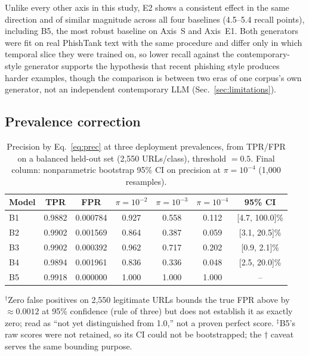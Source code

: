 \documentclass[conference]{IEEEtran}
\begin{document}
Unlike every other axis in this study, E2 shows a consistent effect in
the same direction and of similar magnitude across all four baselines
(4.5--5.4 recall points), including B5, the most robust baseline on
Axis~S and Axis~E1. Both generators were fit on real PhishTank text with
the same procedure and differ only in which temporal slice they were
trained on, so lower recall against the contemporary-style generator
supports the hypothesis that recent phishing style produces harder
examples, though the comparison is between two eras of one corpus's
own generator, not an independent contemporary LLM
(Sec.~\ref{sec:limitations}).

\subsection{Prevalence correction}
\label{sec:prevalence-results}

\begin{table}[t]
\caption{Precision by Eq.~\eqref{eq:prec} at three deployment prevalences,
from TPR/FPR on a balanced held-out set (2{,}550 URLs/class), threshold
$=0.5$. Final column: nonparametric bootstrap 95\% CI on precision at
$\pi{=}10^{-4}$ (1{,}000 resamples).}
\label{tab:prevalence}
\centering\scriptsize
\setlength{\tabcolsep}{3pt}
\begin{tabular}{@{}lcccccc@{}}
\toprule
\textbf{Model} & \textbf{TPR} & \textbf{FPR} & $\pi{=}10^{-2}$ & $\pi{=}10^{-3}$ & $\pi{=}10^{-4}$ & \textbf{95\% CI}\\
\midrule
B1 & 0.9882 & 0.000784 & 0.927 & 0.558 & 0.112 & [4.7, 100.0]\%\\
B2 & 0.9902 & 0.001569 & 0.864 & 0.387 & 0.059 & [3.1, 20.5]\%\\
B3 & 0.9902 & 0.000392 & 0.962 & 0.717 & 0.202 & [0.9, 2.1]\%\\
B4 & 0.9894 & 0.001961 & 0.836 & 0.336 & 0.048 & [2.5, 20.0]\%\\
B5 & 0.9918 & 0.000000\rlap{$^\dagger$} & 1.000 & 1.000 & 1.000 & --\rlap{$^\ddagger$}\\
\bottomrule
\end{tabular}
\vspace{2pt}
\raggedright\scriptsize
$^\dagger$Zero false positives on 2{,}550 legitimate URLs bounds the true
FPR above by $\approx 0.0012$ at 95\% confidence (rule of three) but does
not establish it as exactly zero; read as ``not yet distinguished from
1.0,'' not a proven perfect score.
$^\ddagger$B5's raw scores were not retained, so its CI could not be
bootstrapped; the $\dagger$ caveat serves the same bounding purpose.
\end{table}
\end{document}
